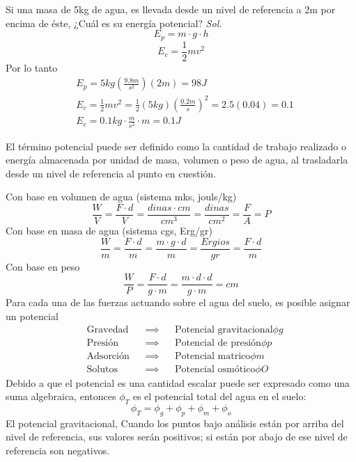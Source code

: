 \begin{example}
    Si una masa de 5kg de agua, es llevada desde un nivel de referencia a 2m por encima de éste, ¿Cuál es su energía potencial?
    \textit{ Sol. }
    \begin{equation}
        E_p = m \cdot g \cdot h
    \end{equation}
    \begin{equation}
        E_c = \frac{1}{2}mv^2
    \end{equation}
    Por lo tanto
    \begin{align*}
        &E_p = 5kg\left(\frac{9.8m}{s^2}\right)\left(2m\right) = 98J\\
        &E_c = \frac{1}{2}mv^2 = \frac{1}{2}(5kg)\left(\frac{0.2m}{s}\right)^2 = 2.5(0.04) = 0.1\\
        &E_c = 0.1kg\cdot \frac{m}{s^2}\cdot m = 0.1J
    \end{align*}
\end{example}
\begin{definition}
    El término potencial puede ser definido como la cantidad  de trabajo realizado o energía almacenada por unidad de masa, volumen o peso de agua, al trasladarla desde un nivel de referencia al punto en cuestión.
\end{definition}
Con base en volumen de agua (sistema mks, jouls/kg)
\begin{equation*}
    \frac{W}{V} = \frac{F \cdot d}{V} =\frac{dinas \cdot cm}{cm^3} =\frac{dinas}{cm^2} = \frac{F}{A} = P
\end{equation*}
Con base en masa de agua (sistema cgs, Erg/gr)
\begin{equation*}
    \frac{W}{m} =\frac{F \cdot d}{m} =\frac{m \cdot g \cdot d}{m} =\frac{Ergios}{gr} =\frac{F \cdot d}{m}
\end{equation*}
Con base en peso
\begin{equation*}
    \frac{W}{P} = \frac{F \cdot d}{g \cdot m} =\frac{m \cdot d \cdot d}{g \cdot m} = cm
\end{equation*}
Para cada una de las fuerzas actuando sobre el agua del suelo, es posible asignar un potencial
\begin{align*}
    &\text{Gravedad}&&\implies&&\text{Potencial gravitacional} \phi g\\
    &\text{Presión}&&\implies&&\text{Potencial de presión} \phi p\\
    &\text{Adsorción}&&\implies&&\text{Potencial matrico} \phi m\\
    &\text{Solutos}&&\implies&&\text{Potencial osmótico} \phi O
\end{align*}
Debido a que el potencial es una cantidad escalar puede ser expresado como una suma algebraica, entonces $\phi_T$ es el potencial total del agua en el suelo:
\begin{equation}
    \phi_T =\phi_g +\phi_p +\phi_m +\phi_o
\end{equation}
El potencial gravitacional, Cuando los puntos bajo análisis están por arriba del nivel de referencia, sus valores serán positivos; si están por abajo de ese nivel de referencia son negativos.


